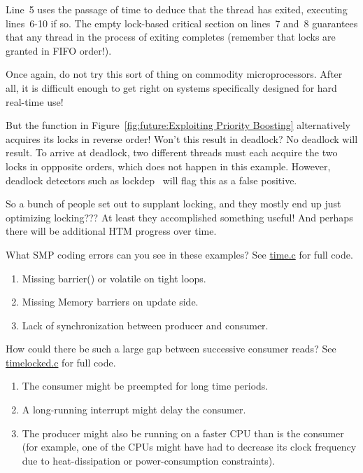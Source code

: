 \begin{enumerate}
	Line~5 uses the passage of time to deduce that the thread
	has exited, executing lines~6-10 if so.
	The empty lock-based critical section on lines~7 and~8
	guarantees that any thread in the process of exiting
	completes (remember that locks are granted in FIFO order!).

	Once again, do not try this sort of thing on commodity
	microprocessors.
	After all, it is difficult enough to get right on systems
	specifically designed for hard real-time use!

\QuickQ{}
	But the  function in
	Figure~\ref{fig:future:Exploiting Priority Boosting}
	alternatively acquires its locks in reverse order!
	Won't this result in deadlock?
\QuickA{}
	No deadlock will result.
	To arrive at deadlock, two different threads must each
	acquire the two locks in oppposite orders, which does not
	happen in this example.
	However, deadlock detectors such as
	lockdep~\cite{JonathanCorbet2006lockdep}
	will flag this as a false positive.

\QuickQ{}
	So a bunch of people set out to supplant locking, and they
	mostly end up just optimizing locking???
\QuickA{}
	At least they accomplished something useful!
	And perhaps there will be additional HTM progress over time.

\QuickQ{}
	What SMP coding errors can you see in these examples?
	See \url{time.c} for full code.
\QuickA{}
	\begin{enumerate}
	\item	Missing barrier() or volatile on tight loops.
	\item	Missing Memory barriers on update side.
	\item	Lack of synchronization between producer and consumer.
	\end{enumerate}

\QuickQ{}
	How could there be such a large gap between successive
	consumer reads?
	See \url{timelocked.c} for full code.
\QuickA{}
	\begin{enumerate}
	\item	The consumer might be preempted for long time periods.
	\item	A long-running interrupt might delay the consumer.
	\item	The producer might also be running on a faster CPU than is the
		consumer (for example, one of the CPUs might have had to
		decrease its
		clock frequency due to heat-dissipation or power-consumption
		constraints).
	\end{enumerate}


\end{enumerate}
